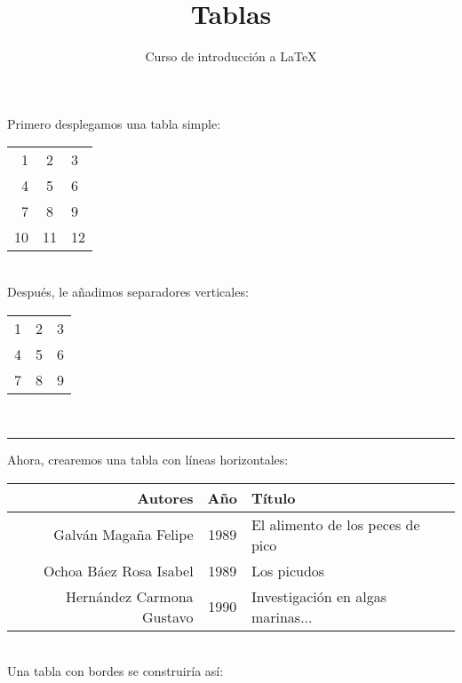 \documentclass[10pt,letterpaper]{article}
\title{Tablas}
\author{Curso de introducción a LaTeX}
\begin{document}
\maketitle
Primero desplegamos una tabla simple: \\

\begin{tabular}{rcl}
    1 & 2 & 3 \\
    4 & 5 & 6 \\
    7 & 8 & 9 \\
	10 & 11& 12\\
\end{tabular}\\ %

Después, le añadimos separadores verticales: \\

\begin{tabular}{ l | c || r }
  1 & 2 & 3 \\
  4 & 5 & 6 \\
  7 & 8 & 9 \\
  \end{tabular}\\ %

\hrule

Ahora, crearemos una tabla con líneas horizontales: \\

\begin{tabular}{rcl}
\hline
Autores & Año   & Título \\
\hline
Galván Magaña Felipe & 1989  & El alimento de los peces de pico \\
Ochoa Báez Rosa Isabel & 1989  & Los picudos \\
Hernández Carmona Gustavo & 1990  & Investigación en algas marinas... \\
\hline
\end{tabular} \\ %

Una tabla con bordes se construiría así: \\
\end{document}

